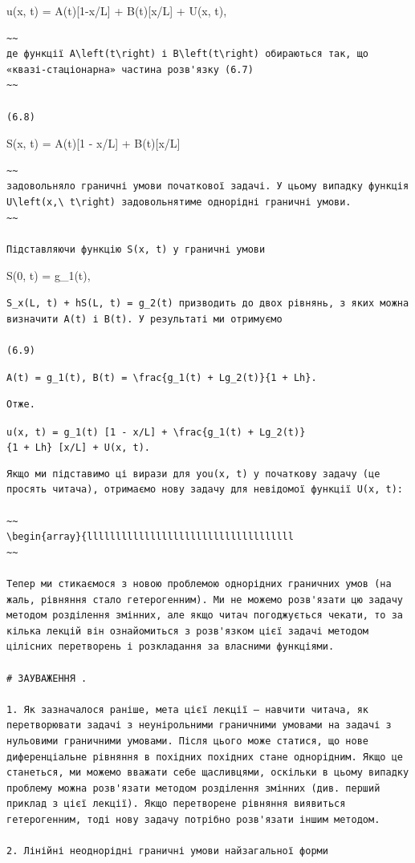 \documentclass[
  ukrainian,
]{article}
\begin{document}
u(x, t) = A(t){[}1-x/L{]} + B(t){[}x/L{]} + U(x, t),

\begin{verbatim}
~~
де функції A\left(t\right) і B\left(t\right) обираються так, що «квазі-стаціонарна» частина розв'язку (6.7)
~~

(6.8)
\end{verbatim}

S(x, t) = A(t){[}1 - x/L{]} + B(t){[}x/L{]}

\begin{verbatim}
~~
задовольняло граничні умови початкової задачі. У цьому випадку функція U\left(x,\ t\right) задовольнятиме однорідні граничні умови.
~~

Підставляючи функцію S(x, t) у граничні умови
\end{verbatim}

S(0, t) = g\_1(t),

\begin{verbatim}
S_x(L, t) + hS(L, t) = g_2(t) призводить до двох рівнянь, з яких можна визначити A(t) і B(t). У результаті ми отримуємо

(6.9)
\end{verbatim}

\texttt{A(t)\ =\ g\_1(t),\ B(t)\ =\ \textbackslash{}frac\{g\_1(t)\ +\ Lg\_2(t)\}\{1\ +\ Lh\}.}

\begin{verbatim}
Отже.
\end{verbatim}

\texttt{u(x,\ t)\ =\ g\_1(t)\ {[}1\ -\ x/L{]}\ +\ \textbackslash{}frac\{g\_1(t)\ +\ Lg\_2(t)\}\{1\ +\ Lh\}\ {[}x/L{]}\ +\ U(x,\ t).}

\begin{verbatim}
Якщо ми підставимо ці вирази для you(x, t) у початкову задачу (це просять читача), отримаємо нову задачу для невідомої функції U(x, t):

~~
\begin{array}{llllllllllllllllllllllllllllllllllll
~~

Тепер ми стикаємося з новою проблемою однорідних граничних умов (на жаль, рівняння стало гетерогенним). Ми не можемо розв'язати цю задачу методом розділення змінних, але якщо читач погоджується чекати, то за кілька лекцій він ознайомиться з розв'язком цієї задачі методом цілісних перетворень і розкладання за власними функціями.

# ЗАУВАЖЕННЯ .

1. Як зазначалося раніше, мета цієї лекції — навчити читача, як перетворювати задачі з неунірольними граничними умовами на задачі з нульовими граничними умовами. Після цього може статися, що нове диференціальне рівняння в похідних похідних стане однорідним. Якщо це станеться, ми можемо вважати себе щасливцями, оскільки в цьому випадку проблему можна розв'язати методом розділення змінних (див. перший приклад з цієї лекції). Якщо перетворене рівняння виявиться гетерогенним, тоді нову задачу потрібно розв'язати іншим методом.

2. Лінійні неоднорідні граничні умови найзагальної форми
\end{verbatim}
\end{document}
